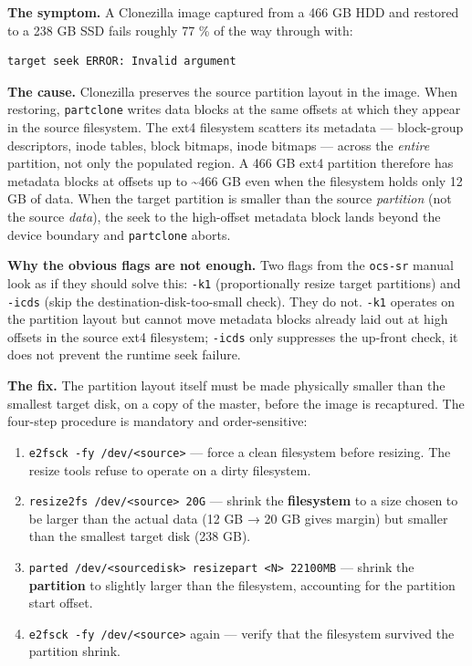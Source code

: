 \textbf{The symptom.} A Clonezilla image captured from a 466 GB HDD and
restored to a 238 GB SSD fails roughly 77 \% of the way through with:

\begin{verbatim}
target seek ERROR: Invalid argument
\end{verbatim}

\textbf{The cause.} Clonezilla preserves the source partition layout in
the image. When restoring, \texttt{partclone} writes data blocks at the
same offsets at which they appear in the source filesystem. The ext4
filesystem scatters its metadata --- block-group descriptors, inode
tables, block bitmaps, inode bitmaps --- across the \emph{entire}
partition, not only the populated region. A 466 GB ext4 partition
therefore has metadata blocks at offsets up to \textasciitilde466 GB
even when the filesystem holds only 12 GB of data. When the target
partition is smaller than the source \emph{partition} (not the source
\emph{data}), the seek to the high-offset metadata block lands beyond
the device boundary and \texttt{partclone} aborts.

\textbf{Why the obvious flags are not enough.} Two flags from the
\texttt{ocs-sr} manual look as if they should solve this: \texttt{-k1}
(proportionally resize target partitions) and \texttt{-icds} (skip the
destination-disk-too-small check). They do not. \texttt{-k1} operates on
the partition layout but cannot move metadata blocks already laid out at
high offsets in the source ext4 filesystem; \texttt{-icds} only
suppresses the up-front check, it does not prevent the runtime seek
failure.

\textbf{The fix.} The partition layout itself must be made physically
smaller than the smallest target disk, on a copy of the master, before
the image is recaptured. The four-step procedure is mandatory and
order-sensitive:

\begin{enumerate}
\def\labelenumi{\arabic{enumi}.}
\tightlist
\item
  \texttt{e2fsck\ -fy\ /dev/\textless{}source\textgreater{}} --- force a
  clean filesystem before resizing. The resize tools refuse to operate
  on a dirty filesystem.
\item
  \texttt{resize2fs\ /dev/\textless{}source\textgreater{}\ 20G} ---
  shrink the \textbf{filesystem} to a size chosen to be larger than the
  actual data (12 GB → 20 GB gives margin) but smaller than the smallest
  target disk (238 GB).
\item
  \texttt{parted\ /dev/\textless{}sourcedisk\textgreater{}\ resizepart\ \textless{}N\textgreater{}\ 22100MB}
  --- shrink the \textbf{partition} to slightly larger than the
  filesystem, accounting for the partition start offset.
\item
  \texttt{e2fsck\ -fy\ /dev/\textless{}source\textgreater{}} again ---
  verify that the filesystem survived the partition shrink.
\end{enumerate}

